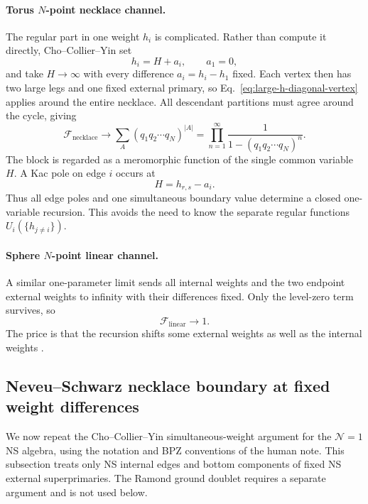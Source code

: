 \documentclass[11pt]{article}
\newcommand{\F}{\mathcal F}
\begin{document}
\paragraph{Torus \(N\)-point necklace channel.}
The regular part in one weight \(h_i\) is complicated.  Rather than compute
it directly, Cho--Collier--Yin set
\begin{equation}
 h_i=H+a_i,\qquad a_1=0,
 \label{eq:necklace-common-weight}
\end{equation}
and take \(H\to\infty\) with every difference \(a_i=h_i-h_1\) fixed.  Each
vertex then has two large legs and one fixed external primary, so
Eq.~\eqref{eq:large-h-diagonal-vertex} applies around the entire necklace.
All descendant partitions must agree around the cycle, giving
\begin{equation}
 \F_{\mathrm{necklace}}
 \longrightarrow
 \sum_A(q_1q_2\cdots q_N)^{|A|}
 =
 \prod_{n=1}^{\infty}
 \frac1{1-(q_1q_2\cdots q_N)^n}.
 \label{eq:necklace-boundary}
\end{equation}
The block is regarded as a meromorphic function of the single common
variable \(H\).  A Kac pole on edge \(i\) occurs at
\begin{equation}
 H=h_{r,s}-a_i.
\end{equation}
Thus all edge poles and one simultaneous boundary value determine a closed
one-variable recursion.  This avoids the need to know the separate regular
functions \(U_i(\{h_{j\ne i}\})\).

\paragraph{Sphere \(N\)-point linear channel.}
A similar one-parameter limit sends all internal weights and the two endpoint
external weights to infinity with their differences fixed.  Only the
level-zero term survives, so
\begin{equation}
 \F_{\mathrm{linear}}\longrightarrow1.
 \label{eq:linear-boundary}
\end{equation}
The price is that the recursion shifts some external weights as well as the
internal weights \cite{ChoCollierYin2017Recursive}.

\subsection{Neveu--Schwarz necklace boundary at fixed weight differences}
\label{sec:ns-necklace-large-h}

We now repeat the Cho--Collier--Yin simultaneous-weight argument for the
\(\mathcal N=1\) NS algebra, using the notation and BPZ conventions of the
human note.  This subsection treats only NS internal edges and bottom
components of fixed NS external superprimaries.  The Ramond ground doublet
requires a separate argument and is not used below.
\end{document}
